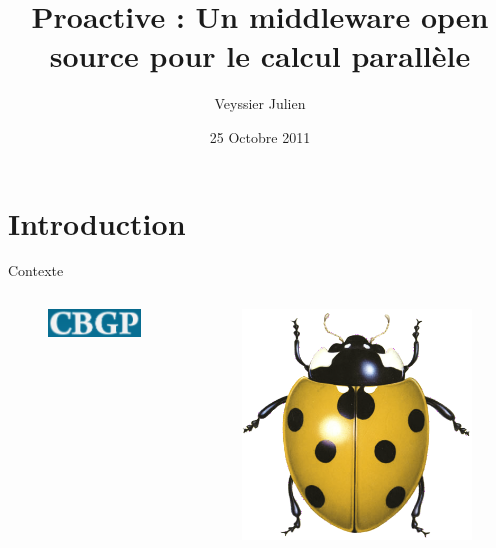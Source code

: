 \documentclass{beamer}
\title{Proactive : Un middleware open source pour le calcul parallèle}
\author{Veyssier Julien}
\institute{CBGP - INRA}
\date{25 Octobre 2011}
\begin{document}
\begin{frame}
\titlepage
\end{frame}

\begin{frame}
\tableofcontents
\end{frame}

\section[Introduction]{Introduction}
\begin{frame}
	\tableofcontents[currentsection]
\end{frame}

\begin{frame}{Contexte}
\pageTransitionDissolve
	\begin{columns}
	\begin{column}[l]{0.5\linewidth}
        \begin{columns}
        \begin{column}[l]{0.5\linewidth}
        \begin{figure}
            \centering
            \includegraphics[scale=0.32]{cbgp.png}
        \end{figure}
        \end{column}
        \begin{column}[r]{0.5\linewidth}
        \begin{figure}
            \centering
            \includegraphics[scale=0.32]{cocci.png}

\end{figure}
\end{column}
\end{columns}
\end{column}
\end{columns}
\end{frame}
\end{document}
